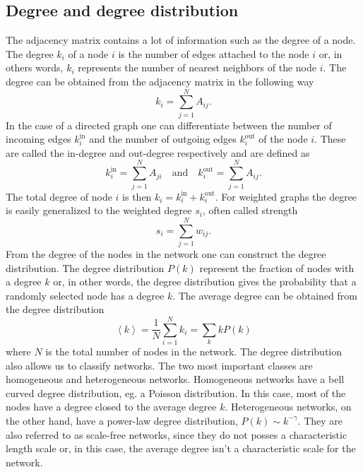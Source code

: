 \documentclass[11 pt , letterpaper , twoside , openright]{book}
\begin{document}
\subsection{Degree and degree distribution}

The adjacency matrix contains a lot of information such as the degree of a node. The degree $k_i$ of a node $i$ is the number of edges attached to the node $i$ or, in others words, $k_i$ represents the number of nearest neighbors of the node $i$. The degree can be obtained from the adjacency matrix in the following way \cite{Mata2020}
\begin{equation}
	k_i = \sum_{j=1}^N A_{ij}.
\end{equation}
In the case of a directed graph one can differentiate between the number of incoming edges $k_i^{\text{in}}$ and the number of outgoing edges $k_i^{\text{out}}$ of the node $i$. These are called the in-degree and out-degree respectively and are defined as \cite{Mata2020}
\begin{equation}
	k_i^{\text{in}} = \sum_{j=1}^N A_{ji} \quad \text{and} \quad k_i^{\text{out}} = \sum_{j=1}^N A_{ij}.
\end{equation}
The total degree of node $i$ is then $k_i = k_i^{\text{in}} + k_i^{\text{out}}$. For weighted graphs the degree is easily generalized to the weighted degree $s_i$, often called strength \cite{Ioannis2007}
\begin{equation}
	s_i = \sum_{j=1}^N w_{ij}.
\end{equation}
From the degree of the nodes in the network one can construct the degree distribution. The degree distribution $P(k)$ represent the fraction of nodes with a degree $k$ or, in other words, the degree distribution gives the probability that a randomly selected node has a degree $k$. The average degree can be obtained from the degree distribution \cite{Mata2020}
\begin{equation}
	\left<k\right> = \frac{1}{N} \sum_{i=1}^N k_i = \sum_k k P(k)
\end{equation}
where $N$ is the total number of nodes in the network. The degree distribution also allows us to classify networks. The two most important classes are homogeneous and heterogeneous networks. Homogeneous networks have a bell curved degree distribution, eg. a Poisson distribution. In this case, most of the nodes have a degree closed to the average degree $k$. Heterogeneous networks, on the other hand, have a power-law degree distribution, $P(k) \sim k^{-\gamma}$. %
They are also referred to as scale-free networks, since they do not posses a characteristic length scale or, in this case, the average degree isn't a characteristic scale for the network. %
\end{document}
